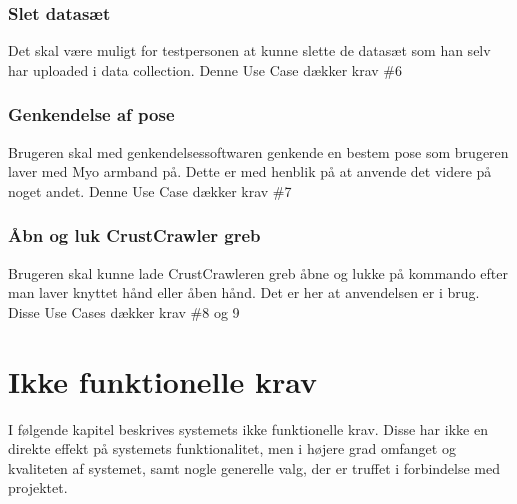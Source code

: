 \subsubsection{Slet datasæt}
Det skal være muligt for testpersonen at kunne slette de datasæt som han selv har uploaded i data collection. Denne Use Case dækker krav \#6

\subsubsection{Genkendelse af pose}
Brugeren skal med genkendelsessoftwaren genkende en bestem pose som brugeren laver med Myo armband på. Dette er med henblik på at anvende det videre på noget andet. Denne Use Case dækker krav \#7

\subsubsection{Åbn og luk CrustCrawler greb}
Brugeren skal kunne lade CrustCrawleren greb åbne og lukke på kommando efter man laver knyttet hånd eller åben hånd. Det er her at anvendelsen er i brug. Disse Use Cases dækker krav \#8 og 9

\section{Ikke funktionelle krav}
\label{sec:ikkefunktionellekrav}
I følgende kapitel beskrives systemets ikke funktionelle krav. Disse har ikke en direkte effekt på systemets funktionalitet, men i højere grad omfanget og kvaliteten af systemet, samt nogle generelle valg, der er truffet i forbindelse med projektet.
